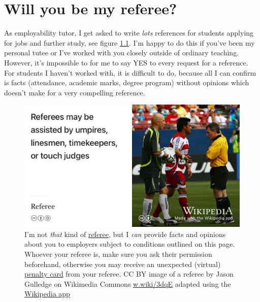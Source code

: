 \documentclass[
  12pt,
]{book}
\begin{document}
\hypertarget{appendix-appendix}{%
\appendix}


\hypertarget{referee}{%
\chapter{Will you be my referee?}\label{referee}}

As employability tutor, I get asked to write \emph{lots} references for students applying for jobs and further study, see figure \ref{fig:referee-fig}. I'm happy to do this if you've been my personal tutee or I've worked with you closely outside of ordinary teaching. However, it's impossible to for me to say YES to every request for a reference. For students I haven't worked with, it is difficult to do, because all I can confirm is facts (attendance, academic marks, degree program) without opinions which doesn't make for a very compelling reference.

\begin{figure}

{\centering \includegraphics[width=0.99\linewidth]{images/referee} 

}

\caption{I'm not \emph{that} kind of \href{https://en.wikipedia.org/wiki/Referee}{referee}, but I \emph{can} provide facts and opinions about you to employers subject to conditions outlined on this page. Whoever your referee is, make sure you ask their permission beforehand, otherwise you may receive an unexpected (virtual) \href{https://en.wikipedia.org/wiki/Penalty_card}{penalty card} from your referee. CC BY image of a referee by Jason Gulledge on Wikimedia Commons \href{https://w.wiki/3dqE}{w.wiki/3dqE} adapted using the \href{https://apps.apple.com/us/app/wikipedia/id324715238}{Wikipedia app}}\label{fig:referee-fig}
\end{figure}
\end{document}
